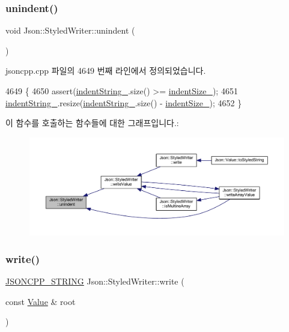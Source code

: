\subsubsection{\texorpdfstring{unindent()}{unindent()}}
{\footnotesize\ttfamily void Json\+::\+Styled\+Writer\+::unindent (\begin{DoxyParamCaption}{ }\end{DoxyParamCaption})\hspace{0.3cm}{\ttfamily [private]}}



jsoncpp.\+cpp 파일의 4649 번째 라인에서 정의되었습니다.


\begin{DoxyCode}
4649                             \{
4650   assert(\hyperlink{class_json_1_1_styled_writer_a7d91709c94c152bd44eaf80faac130ae}{indentString\_}.size() >= \hyperlink{class_json_1_1_styled_writer_a0b5ab768cc56433d463eb1f03da8614e}{indentSize\_});
4651   \hyperlink{class_json_1_1_styled_writer_a7d91709c94c152bd44eaf80faac130ae}{indentString\_}.resize(\hyperlink{class_json_1_1_styled_writer_a7d91709c94c152bd44eaf80faac130ae}{indentString\_}.size() - 
      \hyperlink{class_json_1_1_styled_writer_a0b5ab768cc56433d463eb1f03da8614e}{indentSize\_});
4652 \}
\end{DoxyCode}
이 함수를 호출하는 함수들에 대한 그래프입니다.\+:\nopagebreak
\begin{figure}[H]
\begin{center}
\leavevmode
\includegraphics[width=350pt]{class_json_1_1_styled_writer_acee1c9285519b573cfcb00b7e7f5a809_icgraph}
\end{center}
\end{figure}
\mbox{\label{class_json_1_1_styled_writer_a5efab19b9746da9920c29cdae3a6b404}} 
\subsubsection{\texorpdfstring{write()}{write()}}
{\footnotesize\ttfamily \hyperlink{json_8h_a1e723f95759de062585bc4a8fd3fa4be}{J\+S\+O\+N\+C\+P\+P\+\_\+\+S\+T\+R\+I\+NG} Json\+::\+Styled\+Writer\+::write (\begin{DoxyParamCaption}\item[{const \hyperlink{class_json_1_1_value}{Value} \&}]{root }\end{DoxyParamCaption})\hspace{0.3cm}{\ttfamily [virtual]}}



